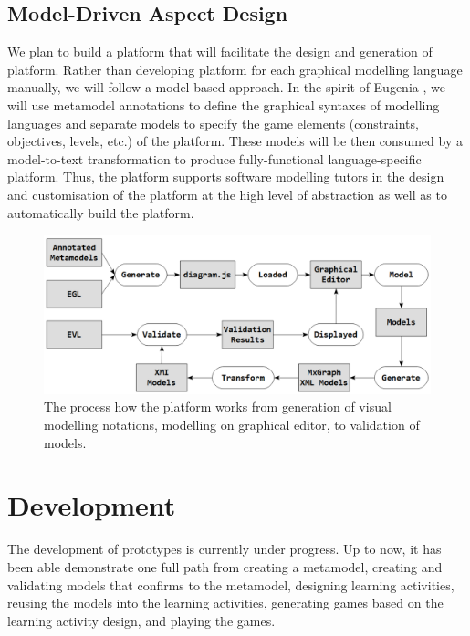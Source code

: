 \documentclass[12pt, a4paper]{report} \usepackage[titletoc]{appendix}
\begin{document}
\begin{appendices}
\subsection{Model-Driven Aspect Design}
We plan to build a platform that will facilitate the design and generation of platform. Rather than developing platform for each graphical modelling language manually, we will follow a model-based approach. In the spirit of Eugenia \cite{kolovos2015eugenia}, we will use metamodel annotations to define the graphical syntaxes of modelling languages and separate models to specify the game elements (constraints, objectives, levels, etc.) of the platform. These models will be then consumed by a model-to-text transformation to produce fully-functional language-specific platform. Thus, the platform supports software modelling tutors in the design and customisation of the platform at the high level of abstraction as well as to automatically build the platform. 

\begin{figure}[ht] \centering \includegraphics[width=12cm]{work-cycle}
\caption{The process how the platform works from generation of visual modelling notations, modelling on graphical editor, to validation of models.}
\label{work-cycle}
\end{figure}

\section{Development}
\label{Development}
The development of prototypes is currently under progress. Up to now, it has been able demonstrate one full path from creating a metamodel, creating and validating models that confirms to the metamodel, designing learning activities, reusing the models into the learning activities, generating games based on the learning activity design, and playing the games. 


\end{appendices}
\end{document}
